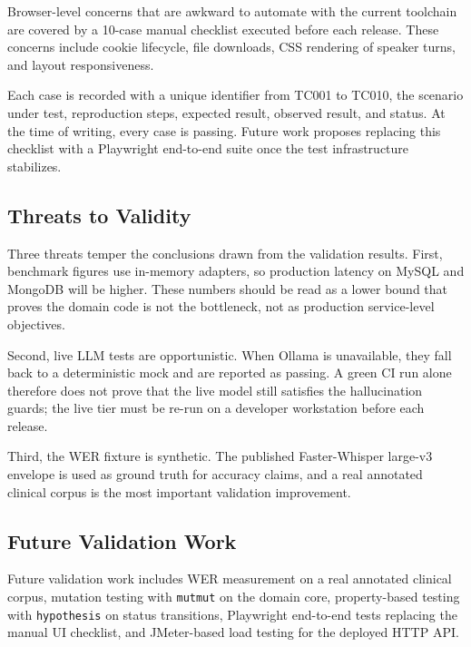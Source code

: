 Browser-level concerns that are awkward to automate with the current toolchain are covered by a 10-case manual checklist executed before each release. These concerns include cookie lifecycle, file downloads, CSS rendering of speaker turns, and layout responsiveness.

Each case is recorded with a unique identifier from TC001 to TC010, the scenario under test, reproduction steps, expected result, observed result, and status. At the time of writing, every case is passing. Future work proposes replacing this checklist with a Playwright end-to-end suite once the test infrastructure stabilizes.

\subsection{Threats to Validity}
\label{subsec:threats-to-validity}

Three threats temper the conclusions drawn from the validation results. First, benchmark figures use in-memory adapters, so production latency on MySQL and MongoDB will be higher. These numbers should be read as a lower bound that proves the domain code is not the bottleneck, not as production service-level objectives.

Second, live LLM tests are opportunistic. When Ollama is unavailable, they fall back to a deterministic mock and are reported as passing. A green CI run alone therefore does not prove that the live model still satisfies the hallucination guards; the live tier must be re-run on a developer workstation before each release.

Third, the WER fixture is synthetic. The published Faster-Whisper large-v3 envelope is used as ground truth for accuracy claims, and a real annotated clinical corpus is the most important validation improvement.

\subsection{Future Validation Work}
\label{subsec:future-validation-work}

Future validation work includes WER measurement on a real annotated clinical corpus, mutation testing with \texttt{mutmut} on the domain core, property-based testing with \texttt{hypothesis} on status transitions, Playwright end-to-end tests replacing the manual UI checklist, and JMeter-based load testing for the deployed HTTP API.